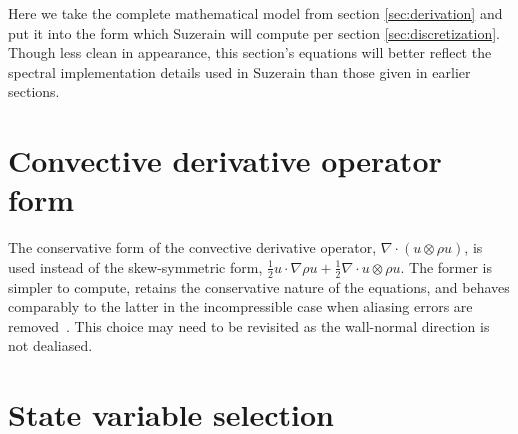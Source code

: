 \documentclass[letterpaper,11pt,nointlimits,reqno,draft]{amsbook}
\begin{document}
Here we take the complete mathematical model from section \ref{sec:derivation}
and put it into the form which Suzerain will compute per section
\ref{sec:discretization}.  Though less clean in appearance, this section's
equations will better reflect the spectral implementation details used in
Suzerain than those given in earlier sections.

\section{Convective derivative operator form}

The conservative form of the convective derivative operator,
$\nabla\cdot\left(u\otimes{}\rho{}u\right)$, is used instead of the
skew-symmetric form, $\frac{1}{2}u\cdot\nabla{}\rho{}u +
\frac{1}{2}\nabla\cdot{}u\otimes{}\rho{}u$.  The former is simpler to compute,
retains the conservative nature of the equations, and behaves comparably to the
latter in the incompressible case when aliasing errors are
removed~\citep{Zang1991Rotation}.  This choice may need to be revisited as the
wall-normal direction is not dealiased.

\section{State variable selection}
\label{state_variable_selection}
\end{document}
